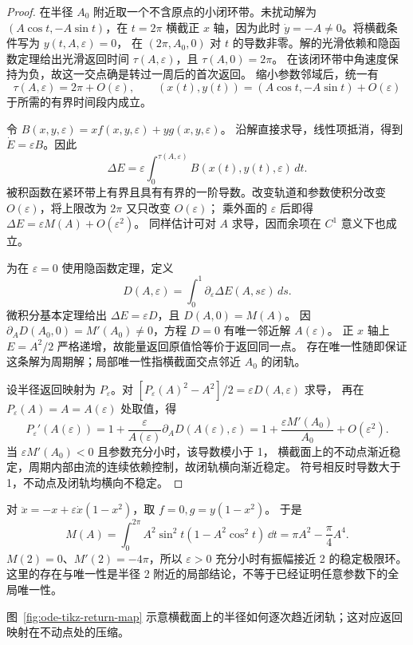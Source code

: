 \begin{proof}
在半径 $A_0$ 附近取一个不含原点的小闭环带。未扰动解为
$(A\cos t,-A\sin t)$，在 $t=2\pi$ 横截正 $x$ 轴，因为此时
$\dot y=-A\ne0$。将横截条件写为 $y(t,A,\varepsilon)=0$，
在 $(2\pi,A_0,0)$ 对 $t$ 的导数非零。解的光滑依赖和隐函数定理给出光滑返回时间
$\tau(A,\varepsilon)$，且 $\tau(A,0)=2\pi$。
在该闭环带中角速度保持为负，故这一交点确是转过一周后的首次返回。
缩小参数邻域后，统一有
\[
 \tau(A,\varepsilon)=2\pi+O(\varepsilon),\qquad
 (x(t),y(t))=(A\cos t,-A\sin t)+O(\varepsilon)
\]
于所需的有界时间段内成立。

令 $B(x,y,\varepsilon)=xf(x,y,\varepsilon)+yg(x,y,\varepsilon)$。
沿解直接求导，线性项抵消，得到 $\dot E=\varepsilon B$。因此
\[
 \Delta E=\varepsilon\int_0^{\tau(A,\varepsilon)}B(x(t),y(t),\varepsilon)\,dt.
\]
被积函数在紧环带上有界且具有有界的一阶导数。改变轨道和参数使积分改变
$O(\varepsilon)$，将上限改为 $2\pi$ 又只改变 $O(\varepsilon)$；
乘外面的 $\varepsilon$ 后即得 $\Delta E=\varepsilon M(A)+O(\varepsilon^2)$。
同样估计可对 $A$ 求导，因而余项在 $C^1$ 意义下也成立。

为在 $\varepsilon=0$ 使用隐函数定理，定义
\[
 D(A,\varepsilon)=\int_0^1\partial_\varepsilon
 \Delta E(A,s\varepsilon)\,ds.
\]
微积分基本定理给出 $\Delta E=\varepsilon D$，且 $D(A,0)=M(A)$。
因 $\partial_AD(A_0,0)=M'(A_0)\ne0$，方程 $D=0$ 有唯一邻近解 $A(\varepsilon)$。
正 $x$ 轴上 $E=A^2/2$ 严格递增，故能量返回原值恰等价于返回同一点。
存在唯一性随即保证这条解为周期解；局部唯一性指横截面交点邻近 $A_0$ 的闭轨。

设半径返回映射为 $P_\varepsilon$。对
$[P_\varepsilon(A)^2-A^2]/2=\varepsilon D(A,\varepsilon)$ 求导，
再在 $P_\varepsilon(A)=A=A(\varepsilon)$ 处取值，得
\[
 P_\varepsilon'(A(\varepsilon))
 =1+\frac{\varepsilon}{A(\varepsilon)}\partial_AD(A(\varepsilon),\varepsilon)
 =1+\frac{\varepsilon M'(A_0)}{A_0}+O(\varepsilon^2).
\]
当 $\varepsilon M'(A_0)<0$ 且参数充分小时，该导数模小于 1，
横截面上的不动点渐近稳定，周期内部由流的连续依赖控制，故闭轨横向渐近稳定。
符号相反时导数大于 1，不动点及闭轨均横向不稳定。
\end{proof}
\begin{example}
对 $\ddot x=-x+\varepsilon\dot x(1-x^2)$，取 $f=0,g=y(1-x^2)$。
于是
\[
 M(A)=\int_0^{2\pi}A^2\sin^2t(1-A^2\cos^2t)\,\dd t
 =\pi A^2-\frac\pi4A^4.
\]
$M(2)=0$、$M'(2)=-4\pi$，所以 $\varepsilon>0$ 充分小时有振幅接近 2 的稳定极限环。
这里的存在与唯一性是半径 2 附近的局部结论，不等于已经证明任意参数下的全局唯一性。
\end{example}


图~\ref{fig:ode-tikz-return-map} 示意横截面上的半径如何逐次趋近闭轨；这对应返回映射在不动点处的压缩。
\begin{center}
\begin{minipage}{0.96\linewidth}
\centering

\label{fig:ode-tikz-return-map}
\end{minipage}
\end{center}

